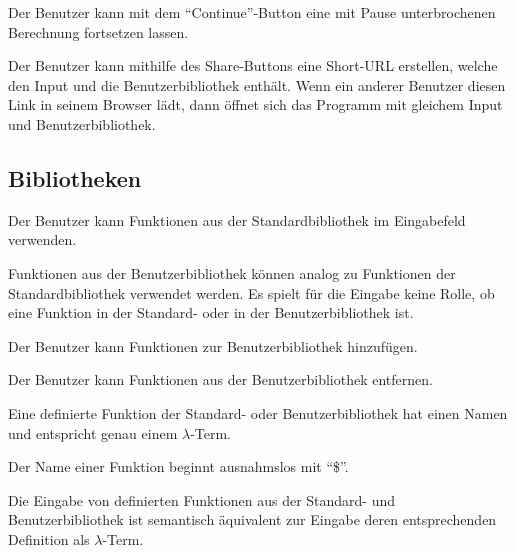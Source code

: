 \documentclass[parskip=full,11pt,twoside]{scrartcl}
\begin{document}
Der Benutzer kann mit dem \enquote{Continue}-Button eine mit Pause unterbrochenen Berechnung fortsetzen lassen.

Der Benutzer kann mithilfe des Share-Buttons eine Short-URL erstellen, welche den Input und die Benutzerbibliothek enthält. Wenn ein anderer Benutzer diesen Link in seinem Browser lädt, dann öffnet sich das Programm mit gleichem Input und Benutzerbibliothek.



\subsection{Bibliotheken}

Der Benutzer kann Funktionen aus der Standardbibliothek im Eingabefeld verwenden.

Funktionen aus der Benutzerbibliothek können analog zu Funktionen der Standardbibliothek verwendet werden. Es spielt für die Eingabe keine Rolle, ob eine Funktion in der Standard- oder in der Benutzerbibliothek ist.

Der Benutzer kann Funktionen zur Benutzerbibliothek hinzufügen.

Der Benutzer kann Funktionen aus der Benutzerbibliothek entfernen.

Eine definierte Funktion der Standard- oder Benutzerbibliothek hat einen Namen und entspricht genau einem $\lambda$-Term.

Der Name einer Funktion beginnt ausnahmslos mit \enquote{\$}.

Die Eingabe von definierten Funktionen aus der Standard- und Benutzerbibliothek ist semantisch äquivalent zur Eingabe deren entsprechenden Definition als $\lambda$-Term.
\end{document}
